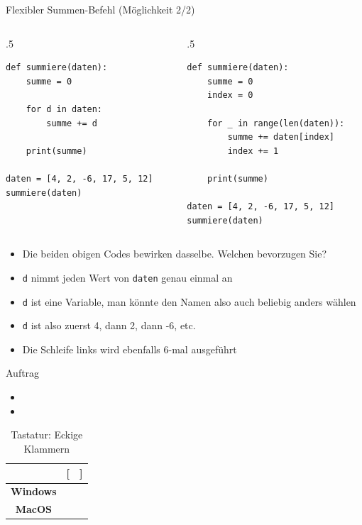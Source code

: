 \begin{frame}[fragile]{Flexibler Summen-Befehl (Möglichkeit 2/2)}
	\begin{columns}
	\begin{column}{.5\textwidth}
	\begin{lstlisting}[basicstyle=\ttfamily\footnotesize]
def summiere(daten):
	summe = 0

	for d in daten:
		summe += d

	print(summe)

daten = [4, 2, -6, 17, 5, 12]
summiere(daten)
		\end{lstlisting}
	\end{column}
	\begin{column}{.5\textwidth}
	\begin{lstlisting}[basicstyle=\ttfamily\footnotesize]
def summiere(daten):
	summe = 0
	index = 0

	for _ in range(len(daten)):
		summe += daten[index]
		index += 1

	print(summe)

daten = [4, 2, -6, 17, 5, 12]
summiere(daten)
		\end{lstlisting}
	\end{column}
	\end{columns}
\begin{itemize}[<+->]
	\item Die beiden obigen Codes bewirken dasselbe. Welchen bevorzugen Sie?
	\item \lstinline|d| nimmt jeden Wert von \lstinline|daten| genau einmal an
	\item \lstinline|d| ist eine Variable, man könnte den Namen also auch beliebig anders wählen
	\item \lstinline|d| ist also zuerst 4, dann 2, dann -6, etc.
	\item Die Schleife links wird ebenfalls 6-mal ausgeführt
\end{itemize}
\end{frame}


\begin{frame}[fragile]{Auftrag}
	\begin{itemize}
		\item {}
		\item {}
	\end{itemize}
	\begin{table}[H]
		\centering
		\begin{tabular}{ccc}
			                 & [               & ]               \\\midrule
			\textbf{Windows} & \keys{\AltGr+ü} & \keys{\AltGr+!} \\\midrule
			\textbf{MacOS}   & \keys{\Alt+5}   & \keys{\Alt+6}   \\
		\end{tabular}
		\caption*{Tastatur: Eckige Klammern}
	\end{table}
\end{frame}

